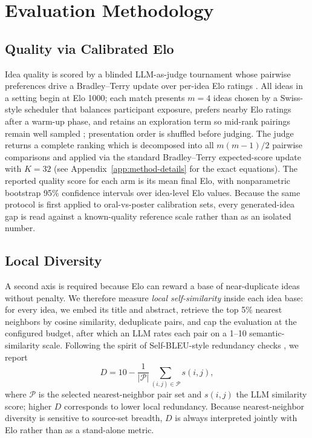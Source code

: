 \documentclass[10pt,twocolumn]{article}
\begin{document}
\section{Evaluation Methodology}

\subsection{Quality via Calibrated Elo}

Idea quality is scored by a blinded LLM-as-judge tournament whose
pairwise preferences drive a Bradley--Terry update over per-idea Elo
ratings \citep{elo1978rating,bradley1952rank}.  All ideas in a setting
begin at Elo 1000; each match presents $m=4$ ideas chosen by a
Swiss-style scheduler that balances participant exposure, prefers
nearby Elo ratings after a warm-up phase, and retains an exploration
term so mid-rank pairings remain well sampled
\citep{zheng2023judgingllmasajudgemtbenchchatbot,chiang2024chatbotarenaopenplatform};
presentation order is shuffled before judging.  The judge returns a
complete ranking which is decomposed into all $m(m-1)/2$ pairwise
comparisons and applied via the standard Bradley--Terry expected-score
update with $K=32$ (see Appendix~\ref{app:method-details} for the
exact equations).  The reported quality score for each arm is its mean
final Elo, with nonparametric bootstrap 95\% confidence intervals over
idea-level Elo values.  Because the same protocol is first applied to
oral-vs-poster calibration sets, every generated-idea gap is read
against a known-quality reference scale rather than as an isolated
number.

\subsection{Local Diversity}

A second axis is required because Elo can reward a base of near-duplicate
ideas without penalty.  We therefore measure \emph{local self-similarity}
inside each idea base: for every idea, we embed its title and abstract,
retrieve the top 5\% nearest neighbors by cosine similarity, deduplicate
pairs, and cap the evaluation at the configured budget, after which an LLM
rates each pair on a 1--10 semantic-similarity scale.  Following the
spirit of Self-BLEU-style redundancy checks \citep{zhu2018texygen}, we
report
\begin{equation}
  D = 10 - \frac{1}{|\mathcal{P}|}\sum_{(i,j)\in\mathcal{P}} s(i,j),
\end{equation}
where $\mathcal{P}$ is the selected nearest-neighbor pair set and
$s(i,j)$ the LLM similarity score; higher $D$ corresponds to lower local
redundancy.  Because nearest-neighbor diversity is sensitive to
source-set breadth, $D$ is always interpreted jointly with Elo rather
than as a stand-alone metric.
\end{document}
